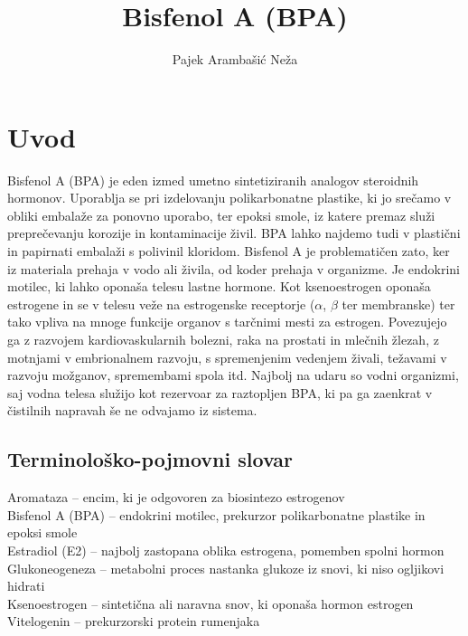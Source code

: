 \documentclass[a4paper, 11pt]{article}
\title{Bisfenol A (BPA)}
\author[1]{Pajek Arambašić Neža}
\affil[1]{Univerza v Ljubljani, Biotehniška fakulteta, Oddelek za biologijo}
\date{}
\begin{document}
\maketitle


\section*{Uvod}
Bisfenol A (BPA) je eden izmed umetno sintetiziranih analogov steroidnih hormonov. Uporablja se pri izdelovanju polikarbonatne plastike, ki jo srečamo v obliki embalaže za ponovno uporabo, ter epoksi smole, iz katere premaz služi preprečevanju korozije in kontaminacije živil. BPA lahko najdemo tudi v plastični in papirnati embalaži s polivinil kloridom. Bisfenol A je problematičen zato, ker iz materiala prehaja v vodo ali živila, od koder prehaja v organizme. Je endokrini motilec, ki lahko oponaša telesu lastne hormone. Kot ksenoestrogen oponaša estrogene in se v telesu veže na estrogenske receptorje ($\alpha$, $\beta$ ter membranske) ter tako vpliva na mnoge funkcije organov s tarčnimi mesti za estrogen. Povezujejo ga z razvojem kardiovaskularnih bolezni, raka na prostati in mlečnih žlezah, z motnjami v embrionalnem razvoju, s spremenjenim vedenjem živali, težavami v razvoju možganov, spremembami spola itd. Najbolj na udaru so vodni organizmi, saj vodna telesa služijo kot rezervoar za raztopljen BPA, ki pa ga zaenkrat v čistilnih napravah še ne odvajamo iz sistema. 

\subsection*{Terminološko-pojmovni slovar}
Aromataza – encim, ki je odgovoren za biosintezo estrogenov\\
Bisfenol A (BPA) – endokrini motilec, prekurzor polikarbonatne plastike in epoksi smole\\
Estradiol (E2) – najbolj zastopana oblika estrogena,  pomemben spolni hormon\\
Glukoneogeneza – metabolni proces nastanka glukoze iz snovi, ki niso ogljikovi hidrati\\
Ksenoestrogen –  sintetična ali naravna snov, ki oponaša hormon estrogen\\
Vitelogenin – prekurzorski protein rumenjaka\\
\end{document}
